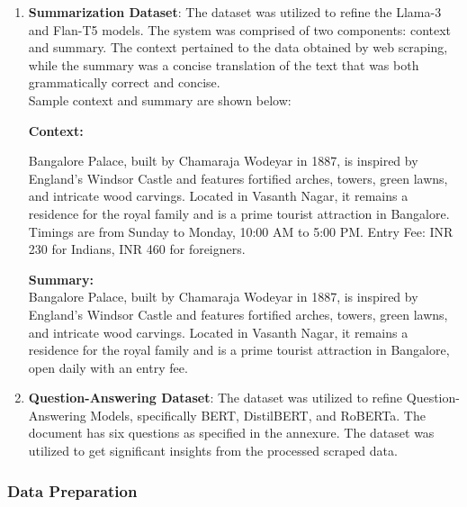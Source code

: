 \documentclass[conference]{IEEEtran}
\begin{document}
        \begin{enumerate}
            \item \textbf{Summarization Dataset}: The dataset was utilized to refine the Llama-3 and Flan-T5 models. The system was comprised of two components: context and summary. The context pertained to the data obtained by web scraping, while the summary was a concise translation of the text that was both grammatically correct and concise.\\

            Sample context and summary are shown below:

            \begin{tcolorbox}[linewidth=1pt, innerleftmargin=15pt, innerrightmargin=15pt, innertopmargin=15pt, innerbottommargin=15pt]
                \textbf{Context:}

                Bangalore Palace, built by Chamaraja Wodeyar in 1887, is inspired by England's Windsor Castle and features fortified arches, towers, green lawns, and intricate wood carvings. Located in Vasanth Nagar, it remains a residence for the royal family and is a prime tourist attraction in Bangalore. Timings are from Sunday to Monday, 10:00 AM to 5:00 PM. Entry Fee: INR 230 for Indians, INR 460 for foreigners.
                {\\}

                \textbf{Summary:} \\
                Bangalore Palace, built by Chamaraja Wodeyar in 1887, is inspired by England's Windsor Castle and features fortified arches, towers, green lawns, and intricate wood carvings. Located in Vasanth Nagar, it remains a residence for the royal family and is a prime tourist attraction in Bangalore, open daily with an entry fee.
            \end{tcolorbox}

            \item \textbf{Question-Answering Dataset}: The dataset was utilized to refine Question-Answering Models, specifically BERT, DistilBERT, and RoBERTa. The document has six questions as specified in the annexure. The dataset was utilized to get significant insights from the processed scraped data.
        \end{enumerate}

        \subsubsection{Data Preparation}
\end{document}
